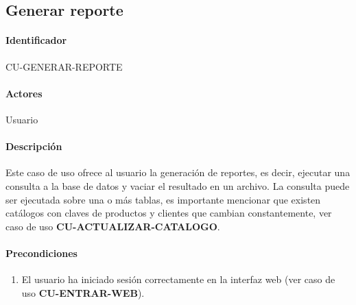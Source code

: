 \subsection{Generar reporte}\label{cu-generar-reporte}
\paragraph{Identificador}
CU-GENERAR-REPORTE
\paragraph{Actores}
Usuario
\paragraph{Descripción}
Este caso de uso ofrece al usuario la generación de reportes, es decir, ejecutar una consulta a la base de datos y vaciar el resultado en un archivo. La consulta puede ser ejecutada sobre una o más tablas, es importante mencionar que existen catálogos con claves de productos y clientes que cambian constantemente, ver caso de uso \textbf{CU-ACTUALIZAR-CATALOGO}.
\paragraph{Precondiciones}
\begin{enumerate}
  \item El usuario ha iniciado sesión correctamente en la interfaz web (ver caso de uso \textbf{CU-ENTRAR-WEB}).
\end{enumerate}
